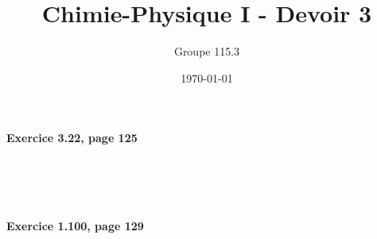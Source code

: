 \documentclass{article}
\title{Chimie-Physique I - Devoir 3}
\author{Groupe 115.3}
\date{\today}
\newcommand\exercice[1]{%
\paragraph{#1}%
~\par
~\par}
\begin{document}
\maketitle

\exercice{Exercice 3.22, page 125}

\exercice{Exercice 1.100, page 129}
\end{document}
